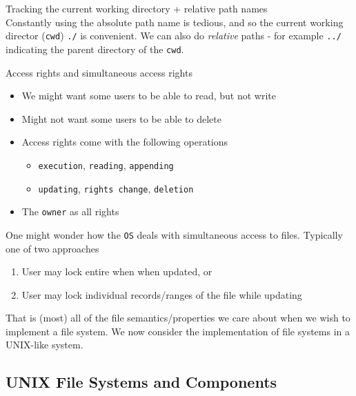 \documentclass[journal, letterpaper]{IEEEtran}
\begin{document}
\begin{aside}{Tracking the current working directory + relative path names} \\
    Constantly using the absolute path name is tedious, and so the current working director (\verb|cwd|) \verb|./| is convenient. We can also do \textit{relative} paths - for example \verb|../| indicating the parent directory of the \verb|cwd|.
\end{aside}
\begin{example}{Access rights and simultaneous access rights}
    \begin{itemize}
        \item We might want some users to be able to read, but not write
        \item Might not want some users to be able to delete
        \item Access rights come with the following operations
        \begin{itemize}
            \item \verb|execution|, \verb|reading|, \verb|appending|
            \item \verb|updating|, \verb|rights change|, \verb|deletion|
        \end{itemize}
        \item The \verb|owner| as all rights
    \end{itemize}
    One might wonder how the \verb|OS| deals with simultaneous access to files. Typically one of two approaches
    \begin{enumerate}
        \item User may lock entire when when updated, or
        \item User may lock individual records/ranges of the file while updating
    \end{enumerate}
\end{example}
That is (most) all of the file semantics/properties we care about when we wish to implement a file system. We now consider the implementation of file systems in a UNIX-like system.
\vspace{-1em}
\subsection{UNIX File Systems and Components}
\end{document}
